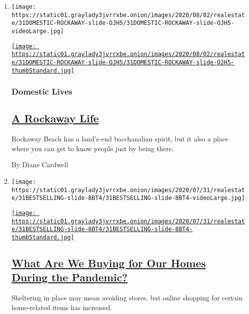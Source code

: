 \begin{enumerate}
\def\labelenumi{\arabic{enumi}.}
\item
  \texttt{[image: https://static01.graylady3jvrrxbe.onion/images/2020/08/02/realestate/31DOMESTIC-ROCKAWAY-slide-OJH5/31DOMESTIC-ROCKAWAY-slide-OJH5-videoLarge.jpg]}

  \href{/2020/07/31/realestate/a-rockaway-beach-queens-life.html}{\texttt{[image: https://static01.graylady3jvrrxbe.onion/images/2020/08/02/realestate/31DOMESTIC-ROCKAWAY-slide-OJH5/31DOMESTIC-ROCKAWAY-slide-OJH5-thumbStandard.jpg]}}

  \hypertarget{domestic-lives}{%
  \subsubsection{Domestic Lives}\label{domestic-lives}}

  \hypertarget{a-rockaway-life}{%
  \subsection{\texorpdfstring{\href{/2020/07/31/realestate/a-rockaway-beach-queens-life.html}{A
  Rockaway Life}}{A Rockaway Life}}\label{a-rockaway-life}}

  Rockaway Beach has a land's-end bacchanalian spirit, but it also a
  place where you can get to know people just by being there.

  By Diane Cardwell
\item
  \texttt{[image: https://static01.graylady3jvrrxbe.onion/images/2020/07/31/realestate/31BESTSELLING-slide-8BT4/31BESTSELLING-slide-8BT4-videoLarge.jpg]}

  \href{/2020/07/31/realestate/pandemic-shopping-home-design.html}{\texttt{[image: https://static01.graylady3jvrrxbe.onion/images/2020/07/31/realestate/31BESTSELLING-slide-8BT4/31BESTSELLING-slide-8BT4-thumbStandard.jpg]}}

  \hypertarget{what-are-we-buying-for-our-homes-during-the-pandemic}{%
  \subsection{\texorpdfstring{\href{/2020/07/31/realestate/pandemic-shopping-home-design.html}{What
  Are We Buying for Our Homes During the
  Pandemic?}}{What Are We Buying for Our Homes During the Pandemic?}}\label{what-are-we-buying-for-our-homes-during-the-pandemic}}

  Sheltering in place may mean avoiding stores, but online shopping for
  certain home-related items has increased.


\end{enumerate}

